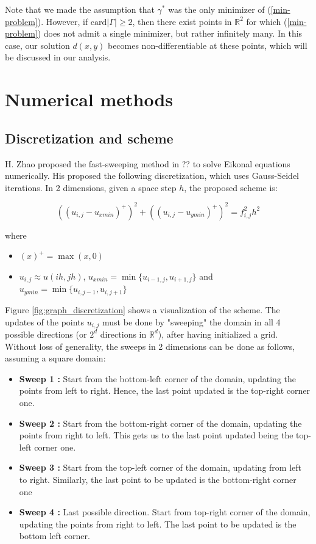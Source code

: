 \documentclass[11pt]{article}
\theoremstyle{definition}
\theoremstyle{remark}
\newcommand{\R}{\mathbb{R}}
\begin{document}
\noindent Note that we made the assumption that $\gamma^{*}$ was the only minimizer of (\ref{min-problem}). However, if $\text{card}|\Gamma|\geq2$, then there exist points in $\R^2$ for which (\ref{min-problem}) does not admit a single minimizer, but rather infinitely many. In this case, our solution $d(x,y)$ becomes non-differentiable at these points, which will be discussed in our analysis.
\section{Numerical methods}
\subsection{Discretization and scheme}
H. Zhao proposed the fast-sweeping method in ?? to solve Eikonal equations numerically. His proposed the following discretization, which uses Gauss-Seidel iterations. In 2 dimensions, given a space step $h$, the proposed scheme is:

\begin{equation*}
    ((u_{i,j}-u_{xmin})^{+})^2+((u_{i,j}-u_{ymin})^{+})^2 = f_{i,j}^{2}h^2
\end{equation*}

\noindent where
\begin{itemize}
    \item $(x)^{+} = \max(x,0)$
    \item $u_{i,j}\approx u(ih,jh)$, $u_{xmin} = \min\{u_{i-1,j},u_{i+1,j}\}$ and $u_{ymin} = \min\{u_{i,j-1},u_{i,j+1}\}$
\end{itemize}

\noindent Figure \ref{fig:graph_discretization} shows a visualization of the scheme. The updates of the points $u_{i,j}$ must be done by "sweeping" the domain in all 4 possible directions (or $2^d$ directions in $\mathbb{R}^d$), after having initialized a grid. Without loss of generality, the sweeps in 2 dimensions can be done as follows, assuming a square domain:
\begin{itemize}
    \item \textbf{Sweep 1 : } Start from the bottom-left corner of the domain, updating the points from left to right. Hence, the last point updated is the top-right corner one.
    \item \textbf{Sweep 2 : } Start from the bottom-right corner of the domain, updating the points from right to left. This gets us to the last point updated being the top-left corner one.
    \item  \textbf{Sweep 3 : } Start from the top-left corner of the domain, updating from left to right. Similarly, the last point to be updated is the bottom-right corner one
    \item \textbf{Sweep 4 : } Last possible direction. Start from top-right corner of the domain, updating the points from right to left. The last point to be updated is the bottom left corner.
\end{itemize}
\end{document}
